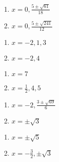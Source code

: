 \begin{multicols}{2}
\begin{enumerate}
\setcounter{enumi}{\value{HW}}

\item  $x = 0, \frac{5\pm \sqrt{61}}{18}$
\item  $x = 0, \frac{5 \pm \sqrt{241}}{12}$

\setcounter{HW}{\value{enumi}}
\end{enumerate}
\end{multicols}

\begin{multicols}{2}
\begin{enumerate}
\setcounter{enumi}{\value{HW}}

\item $x = -2,1,3$
\item $x=-2,4$

\setcounter{HW}{\value{enumi}}
\end{enumerate}
\end{multicols}


\begin{multicols}{2}
\begin{enumerate}
\setcounter{enumi}{\value{HW}}

\item $x=7$
\item $x = \frac{1}{2}, 4, 5$

\setcounter{HW}{\value{enumi}}
\end{enumerate}
\end{multicols}

\begin{multicols}{2}
\begin{enumerate}
\setcounter{enumi}{\value{HW}}

\item $x = -2, \frac{3 \pm \sqrt{69}}{6}$

\item $x = \pm \sqrt{3}$


\setcounter{HW}{\value{enumi}}
\end{enumerate}
\end{multicols}

\begin{multicols}{2}
\begin{enumerate}
\setcounter{enumi}{\value{HW}}

\item $x = \pm \sqrt{5}$

\item $x = -\frac{3}{2}, \pm \sqrt{3}$

\setcounter{HW}{\value{enumi}}
\end{enumerate}
\end{multicols}

